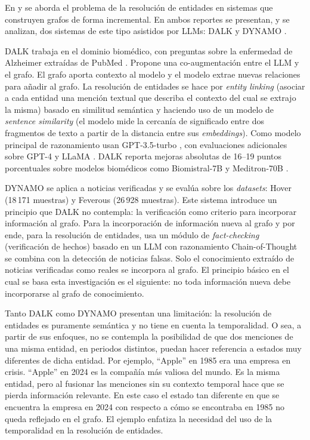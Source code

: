 En \cite{dalk2024} y \cite{dynamo2025} se aborda el problema de la resolución de entidades en sistemas que construyen grafos de forma incremental. En ambos reportes se presentan, y se analizan, dos sistemas de este tipo asistidos por LLMs: DALK \cite{dalk2024} y DYNAMO \cite{dynamo2025}.

DALK trabaja en el dominio biomédico, con preguntas sobre la enfermedad de Alzheimer extraídas de PubMed \cite{pubmed_placeholder}. Propone una co-augmentación entre el LLM y el grafo. El grafo aporta contexto al modelo y el modelo extrae nuevas relaciones para añadir al grafo. La resolución de entidades se hace por \emph{entity linking} \cite{entity_linking_placeholder} (asociar a cada entidad una mención textual que describa el contexto del cual se extrajo la misma) basado en similitud semántica y haciendo uso de un modelo de \emph{sentence similarity} \cite{sentence_embedding_placeholder} (el modelo mide la cercanía de significado entre dos fragmentos de texto a partir de la distancia entre sus \emph{embeddings}). Como modelo principal de razonamiento usan GPT-3.5-turbo \cite{gpt35_placeholder}, con evaluaciones adicionales sobre GPT-4 \cite{gpt35_placeholder} y LLaMA \cite{llama3_2024}. DALK reporta mejoras absolutas de 16--19 puntos porcentuales sobre modelos biomédicos como Biomistral-7B \cite{biomistral_placeholder} y Meditron-70B \cite{meditron_placeholder}.

DYNAMO se aplica a noticias verificadas y se evalúa sobre los \emph{datasets}: Hover \cite{hover_placeholder} (18\,171 muestras) y Feverous \cite{feverous_placeholder} (26\,928 muestras). Este sistema introduce un principio que DALK no contempla: la verificación como criterio para incorporar información al grafo. Para la incorporación de información nueva al grafo y por ende, para la resolución de entidades, usa un módulo de \emph{fact-checking} \cite{fact_checking_placeholder} (verificación de hechos) basado en un LLM con razonamiento Chain-of-Thought \cite{wei2022cot} se combina con la detección de noticias falsas. Solo el conocimiento extraído de noticias verificadas como reales se incorpora al grafo. El principio básico en el cual se basa esta investigación es el siguiente: no toda información nueva debe incorporarse al grafo de conocimiento.

Tanto DALK como DYNAMO presentan una limitación: la resolución de entidades es puramente semántica y no tiene en cuenta la temporalidad. O sea, a partir de sus enfoques, no se contempla la posibilidad de que dos menciones de una misma entidad, en periodos distintos, puedan hacer referencia a estados muy diferentes de dicha entidad. Por ejemplo, ``Apple'' en 1985 era una empresa en crisis. ``Apple'' en 2024 es la compañía más valiosa del mundo. Es la misma entidad, pero al fusionar las menciones sin su contexto temporal hace que se pierda información relevante. En este caso el estado tan diferente en que se encuentra la empresa en 2024 con respecto a cómo se encontraba en 1985 no queda reflejado en el grafo. El ejemplo enfatiza la necesidad del uso de la temporalidad en la resolución de entidades.

